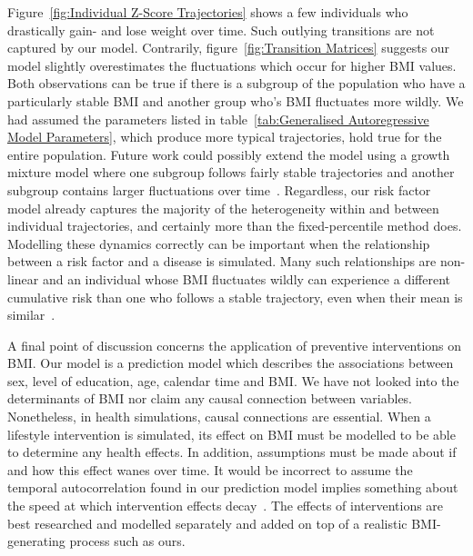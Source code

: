 \documentclass{imammb}
\numberwithin{equation}{section}
\begin{document}
Figure~\ref{fig:Individual Z-Score Trajectories} shows a few individuals who drastically gain- and lose weight over time. Such outlying transitions are not captured by our model. Contrarily, figure~\ref{fig:Transition Matrices} suggests our model slightly overestimates the fluctuations which occur for higher BMI values. Both observations can be true if there is a subgroup of the population who have a particularly stable BMI and another group who's BMI fluctuates more wildly. We had assumed the parameters listed in table~\ref{tab:Generalised Autoregressive Model Parameters}, which produce more typical trajectories, hold true for the entire population. Future work could possibly extend the model using a growth mixture model where one subgroup follows fairly stable trajectories and another subgroup contains larger fluctuations over time~\citep{Herle2020}. Regardless, our risk factor model already captures the majority of the heterogeneity within and between individual trajectories, and certainly more than the fixed-percentile method does. Modelling these dynamics correctly can be important when the relationship between a risk factor and a disease is simulated. Many such relationships are non-linear and an individual whose BMI fluctuates wildly can experience a different cumulative risk than one who follows a stable trajectory, even when their mean is similar~\citep{Murray2020}.

A final point of discussion concerns the application of preventive interventions on BMI. Our model is a prediction model which describes the associations between sex, level of education, age, calendar time and BMI. We have not looked into the determinants of BMI nor claim any causal connection between variables. Nonetheless, in health simulations, causal connections are essential. When a lifestyle intervention is simulated, its effect on BMI must be modelled to be able to determine any health effects. In addition, assumptions must be made about if and how this effect wanes over time. It would be incorrect to assume the temporal autocorrelation found in our prediction model implies something about the speed at which intervention effects decay~\citep{Bayer2011}. The effects of interventions are best researched and modelled separately and added on top of a realistic BMI-generating process such as ours.
\end{document}
